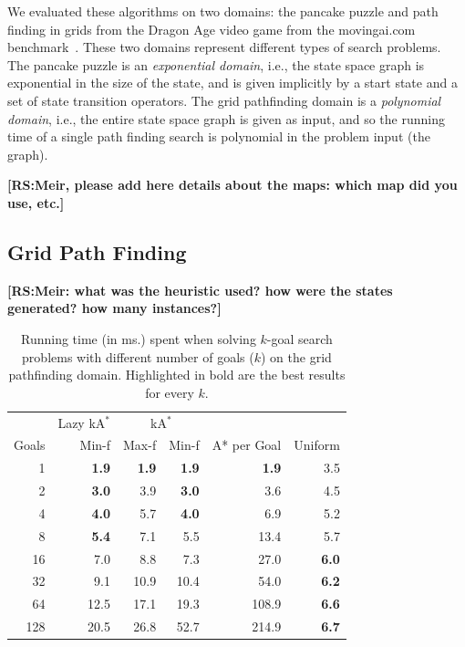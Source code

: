 \documentclass{aicom2e}
\newcommand{\kgs}{$k$-goal search}
\newcommand{\kastar}{kA$^*$}
\newcommand{\roni}[1]{\textbf{[RS:#1]}}
\begin{document}
We evaluated these algorithms on two domains: the pancake puzzle and path finding in grids from the Dragon Age video game from the movingai.com benchmark~\cite{sturtevant2012benchmarks}. These two domains represent different types of search problems. The pancake puzzle is an {\em exponential domain}, i.e., the state space graph is exponential in the size of the state, and is given implicitly by a start state and a set of state transition operators. The grid pathfinding domain is a {\em polynomial domain}, i.e., the entire state space graph is given as input, and so the running time of a single path finding search is polynomial in the problem input (the graph). 

\roni{Meir, please add here details about the maps: which map did you use, etc.}
\subsection{Grid Path Finding}
\roni{Meir: what was the heuristic used? how were the states generated? how many instances?}

\begin{table}[]
	\centering
	\begin{tabular}{r|r|rr|r|r}
		& \multicolumn{1}{c|}{Lazy \kastar{}} & \multicolumn{2}{c|}{\kastar{}} &             &         \\
		Goals & Min-f                        & Max-f      & Min-f      & A* per Goal & Uniform \\
		\hline
1     & \textbf{1.9}                 & \textbf{1.9} & \textbf{1.9} & \textbf{1.9} & 3.5          \\
2     & \textbf{3.0}                 & 3.9          & \textbf{3.0} & 3.6          & 4.5          \\
4     & \textbf{4.0}                 & 5.7          & \textbf{4.0} & 6.9          & 5.2          \\
8     & \textbf{5.4}                 & 7.1          & 5.5          & 13.4         & 5.7          \\
16    & 7.0                          & 8.8          & 7.3          & 27.0         & \textbf{6.0} \\
32    & 9.1                          & 10.9         & 10.4         & 54.0         & \textbf{6.2} \\
64    & 12.5                         & 17.1         & 19.3         & 108.9        & \textbf{6.6} \\
128   & 20.5                         & 26.8         & 52.7         & 214.9        & \textbf{6.7}  
	\end{tabular}
	\caption{Running time (in ms.) spent when solving \kgs{} problems with different number of goals ($k$) on the grid pathfinding domain. Highlighted in bold are the best results for every $k$.}
	\label{tab:pathfinding-runtime}
\end{table}
\end{document}
